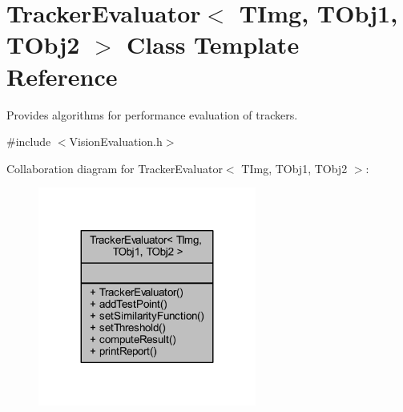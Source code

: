 \hypertarget{class_vision_core_1_1_evaluation_1_1_tracker_evaluator}{}\section{Tracker\+Evaluator$<$ T\+Img, T\+Obj1, T\+Obj2 $>$ Class Template Reference}
\label{class_vision_core_1_1_evaluation_1_1_tracker_evaluator}


Provides algorithms for performance evaluation of trackers.  




{\ttfamily \#include $<$Vision\+Evaluation.\+h$>$}



Collaboration diagram for Tracker\+Evaluator$<$ T\+Img, T\+Obj1, T\+Obj2 $>$\+:
\nopagebreak
\begin{figure}[H]
\begin{center}
\leavevmode
\includegraphics[width=203pt]{class_vision_core_1_1_evaluation_1_1_tracker_evaluator__coll__graph}
\end{center}
\end{figure}
